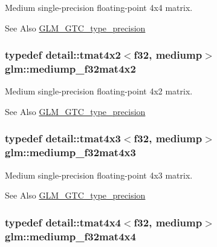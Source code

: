 Medium single-\/precision floating-\/point 4x4 matrix. \begin{DoxySeeAlso}{See Also}
\hyperlink{group__gtc__type__precision}{G\-L\-M\-\_\-\-G\-T\-C\-\_\-type\-\_\-precision} 
\end{DoxySeeAlso}
\hypertarget{group__gtc__type__precision_ga3400d5463f0a58cf3959406aa2b69f72}{
\subsubsection[{mediump\-\_\-f32mat4x2}]{\setlength{\rightskip}{0pt plus 5cm}typedef detail\-::tmat4x2$<$f32, mediump$>$ {\bf glm\-::mediump\-\_\-f32mat4x2}}}\label{group__gtc__type__precision_ga3400d5463f0a58cf3959406aa2b69f72}
Medium single-\/precision floating-\/point 4x2 matrix. \begin{DoxySeeAlso}{See Also}
\hyperlink{group__gtc__type__precision}{G\-L\-M\-\_\-\-G\-T\-C\-\_\-type\-\_\-precision} 
\end{DoxySeeAlso}
\hypertarget{group__gtc__type__precision_ga31635d753ab8a19fdaa80d2b89e90c54}{
\subsubsection[{mediump\-\_\-f32mat4x3}]{\setlength{\rightskip}{0pt plus 5cm}typedef detail\-::tmat4x3$<$f32, mediump$>$ {\bf glm\-::mediump\-\_\-f32mat4x3}}}\label{group__gtc__type__precision_ga31635d753ab8a19fdaa80d2b89e90c54}
Medium single-\/precision floating-\/point 4x3 matrix. \begin{DoxySeeAlso}{See Also}
\hyperlink{group__gtc__type__precision}{G\-L\-M\-\_\-\-G\-T\-C\-\_\-type\-\_\-precision} 
\end{DoxySeeAlso}
\hypertarget{group__gtc__type__precision_ga8f83086fffe71f9cd15e75a1de101ba6}{
\subsubsection[{mediump\-\_\-f32mat4x4}]{\setlength{\rightskip}{0pt plus 5cm}typedef detail\-::tmat4x4$<$f32, mediump$>$ {\bf glm\-::mediump\-\_\-f32mat4x4}}}\label{group__gtc__type__precision_ga8f83086fffe71f9cd15e75a1de101ba6}
